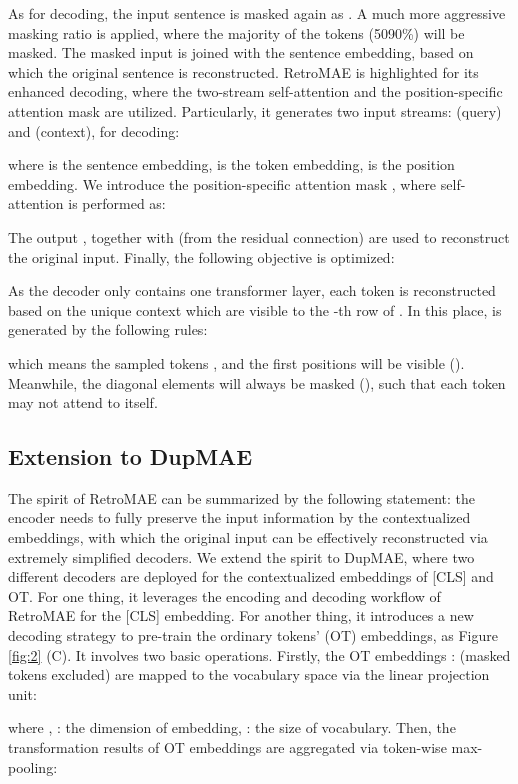 \documentclass[11pt,a4paper]{article}
\begin{document}
As for decoding, the input sentence  is masked again as . A much more aggressive masking ratio is applied, where the majority of the tokens (5090\%) will be masked. The masked input is joined with the sentence embedding, based on which the original sentence is reconstructed. RetroMAE is highlighted for its enhanced decoding, where the two-stream self-attention and the position-specific attention mask are utilized. Particularly, it generates two input streams:  (query) and  (context), for decoding:

where  is the sentence embedding,  is the token embedding,  is the position embedding.
We introduce the position-specific attention mask , where self-attention is performed as:

The output , together with  (from the residual connection) are used to reconstruct the original input.
Finally, the following objective is optimized: 
 
As the decoder only contains one transformer layer, each token  is reconstructed based on the unique context which are visible to the -th row of . In this place,  is generated by the following rules:  

which means the sampled tokens , and the first positions will be visible (). Meanwhile, the diagonal elements will always be masked (), such that each token may not attend to itself.  




\subsection{Extension to DupMAE}\label{sec:method-dup}
The spirit of RetroMAE can be summarized by the following statement: the encoder needs to fully preserve the input information by the contextualized embeddings, with which the original input can be effectively reconstructed via extremely simplified decoders. We extend the spirit to DupMAE, where two different decoders are deployed for the contextualized embeddings of [CLS] and OT. For one thing, it leverages the encoding and decoding workflow of RetroMAE for the [CLS] embedding. For another thing, it introduces a new decoding strategy to pre-train the ordinary tokens' (OT) embeddings, as Figure \ref{fig:2} (C). It involves two basic operations. Firstly, the OT embeddings :  (masked tokens excluded) are mapped to the vocabulary space via the linear projection unit: 

where , : the dimension of embedding, : the size of vocabulary. Then, the transformation results of OT embeddings are aggregated via token-wise max-pooling:
\end{document}
